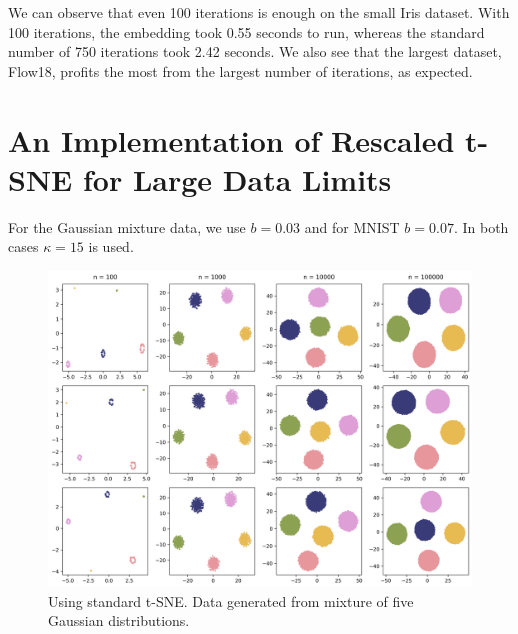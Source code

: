 We can observe that even 100 iterations is enough on the small Iris dataset. 
With 100 iterations, the embedding took 0.55 seconds to run, whereas the standard number of 750 iterations took 2.42 seconds. 
We also see that the largest dataset, Flow18, profits the most from the largest number of iterations, as expected. 

\section{An Implementation of Rescaled t-SNE for Large Data Limits}
For the Gaussian mixture data, we use $b=0.03$ and for MNIST $b=0.07$. In both cases $\kappa=15$ is used. 

\begin{figure}[h]
    \centering 
        \includegraphics[width=\linewidth]{figures/rescaled/Gaussian_Mixture_standard_embedding_grid.png}
        \caption{Using standard t-SNE. Data generated from mixture of five Gaussian distributions.}
    \label{fig:Gaussian-standard}
\end{figure}

